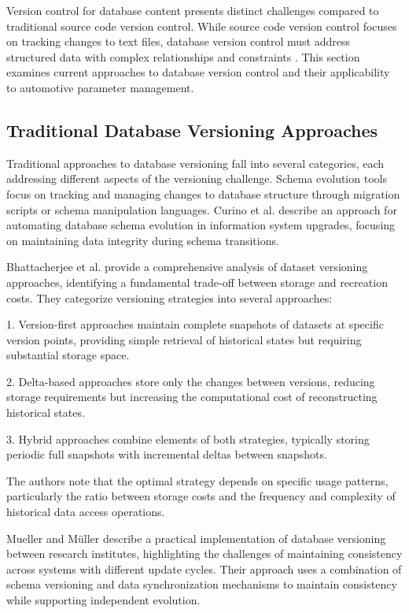 Version control for database content presents distinct challenges compared to traditional source code version control. While source code version control focuses on tracking changes to text files, database version control must address structured data with complex relationships and constraints \cite{bhattacherjee2015principles}. This section examines current approaches to database version control and their applicability to automotive parameter management.

\subsection{Traditional Database Versioning Approaches}
\label{subsec:traditional-database-versioning}

Traditional approaches to database versioning fall into several categories, each addressing different aspects of the versioning challenge. Schema evolution tools focus on tracking and managing changes to database structure through migration scripts or schema manipulation languages. Curino et al. \cite{curino2009automating} describe an approach for automating database schema evolution in information system upgrades, focusing on maintaining data integrity during schema transitions.

Bhattacherjee et al. \cite{bhattacherjee2015principles} provide a comprehensive analysis of dataset versioning approaches, identifying a fundamental trade-off between storage and recreation costs. They categorize versioning strategies into several approaches:

1. Version-first approaches maintain complete snapshots of datasets at specific version points, providing simple retrieval of historical states but requiring substantial storage space.

2. Delta-based approaches store only the changes between versions, reducing storage requirements but increasing the computational cost of reconstructing historical states.

3. Hybrid approaches combine elements of both strategies, typically storing periodic full snapshots with incremental deltas between snapshots.

The authors note that the optimal strategy depends on specific usage patterns, particularly the ratio between storage costs and the frequency and complexity of historical data access operations.

Mueller and Müller \cite{mueller2018conception} describe a practical implementation of database versioning between research institutes, highlighting the challenges of maintaining consistency across systems with different update cycles. Their approach uses a combination of schema versioning and data synchronization mechanisms to maintain consistency while supporting independent evolution.


